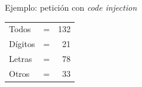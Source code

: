 \begin{frame}[t]
{\begin{columns}
            \begin{block}{\small Ejemplo: petición con \textit{code injection}}
                \vspace{-0.3cm}
                \begin{flushleft}
                    \small
                    \begin{tabular}{lcr}
                        Todos   & = &       \num{132}  \\
                        Dígitos & = & \alert{\num{21}} \\
                        Letras  & = &        \num{78}  \\
                        Otros   & = & \alert{\num{33}} \\
                    \end{tabular}
                \end{flushleft}
            \end{block}
        \end{columns}
    }
\end{frame}

